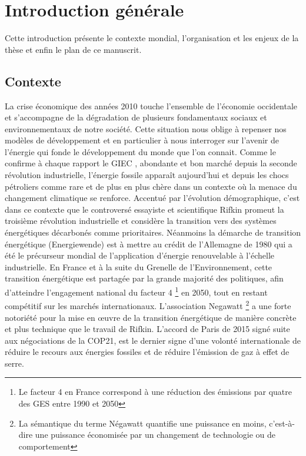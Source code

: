 \chapter*{Introduction générale}

Cette introduction présente le contexte mondial, l'organisation et les enjeux de la thèse et enfin le plan de ce manuscrit.

\section*{Contexte}

La crise économique des années 2010 touche l'ensemble de l'économie occidentale et s'accompagne de la dégradation de plusieurs fondamentaux sociaux et environnementaux de notre société. Cette situation nous oblige à repenser nos modèles de développement et en particulier à nous interroger sur l'avenir de l'énergie qui fonde le développement du monde que l'on connait. Comme le confirme à chaque rapport le GIEC \cite{GIEC-14}, abondante et bon marché depuis la seconde révolution industrielle, l'énergie fossile apparaît aujourd'hui et depuis les chocs pétroliers comme rare et de plus en plus chère dans un contexte où la menace du changement climatique se renforce. Accentué par l'évolution démographique, c'est dans ce contexte que le controversé essayiste et scientifique Rifkin \cite{Rifkin-12} promeut la troisième révolution industrielle et considère la transition vers des systèmes énergétiques décarbonés comme prioritaires. Néanmoins la démarche de transition énergétique (Energiewende) est à mettre au crédit de l'Allemagne de 1980 qui a été le précurseur mondial de l'application d'énergie renouvelable à l'échelle industrielle. En France et à la suite du Grenelle de l'Environnement, cette transition énergétique est partagée par la grande majorité des politiques, afin d'atteindre l'engagement national du facteur 4 \footnote{Le facteur 4 en France correspond à une réduction des émissions par quatre des GES entre 1990 et 2050} en 2050, tout en restant compétitif sur les marchés internationaux. L'association Negawatt \footnote{La sémantique du terme Négawatt quantifie une puissance en moins, c'est-à-dire une puissance économisée par un changement de technologie ou de comportement} a une forte notoriété pour la mise en œuvre de la transition énergétique de manière concrète et plus technique que le travail de Rifkin. L'accord de Paris de 2015 signé suite aux négociations de la COP21, est le dernier signe d'une volonté internationale de réduire le recours aux énergies fossiles et de réduire l'émission de gaz à effet de serre.

